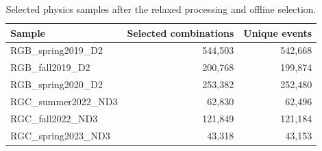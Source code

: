 \begin{table}[htbp]\centering
\begin{tabular}{lrr}\toprule
Sample & Selected combinations & Unique events\\\midrule
RGB\_spring2019\_D2 & 544,503 & 542,668\\
RGB\_fall2019\_D2 & 200,768 & 199,874\\
RGB\_spring2020\_D2 & 253,382 & 252,480\\
RGC\_summer2022\_ND3 & 62,830 & 62,496\\
RGC\_fall2022\_ND3 & 121,849 & 121,184\\
RGC\_spring2023\_ND3 & 43,318 & 43,153\\
\bottomrule\end{tabular}
\caption{Selected physics samples after the relaxed processing and offline selection.}\label{tab:release_counts}
\end{table}
